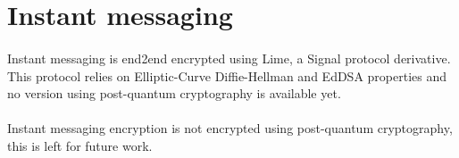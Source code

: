 \documentclass[a4paper,11pt]{article}
\begin{document}
\newpage
\section{Instant messaging}
\paragraph*{}Instant messaging is end2end encrypted using Lime\citep{lime}, a Signal protocol derivative. This protocol relies on Elliptic-Curve Diffie-Hellman and EdDSA properties and no version using post-quantum cryptography is available yet.
\paragraph*{}Instant messaging encryption is not encrypted using post-quantum cryptography, this is left for future work.

\newpage



\end{document}
